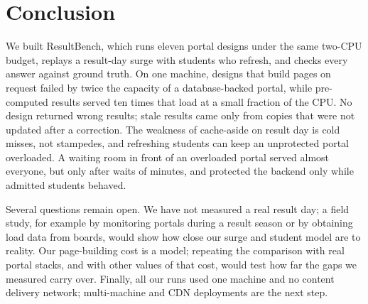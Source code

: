 \section{Conclusion}
\label{sec:conclusion}

We built ResultBench, which runs eleven portal designs
under the same two-CPU budget, replays a result-day surge with students who
refresh, and checks every answer against ground truth. On one machine, designs
that build pages on request failed by twice the capacity of a database-backed
portal, while pre-computed results served ten times that load at a small
fraction of the CPU. No design returned wrong results; stale results came only
from copies that were not updated after a correction. The weakness of
cache-aside on result day is cold misses, not stampedes, and refreshing
students can keep an unprotected portal overloaded.
A waiting room in front of an overloaded portal served almost everyone, but
only after waits of minutes, and protected the backend only while admitted
students behaved.

Several questions remain open. We have not measured a real result day; a field
study, for example by monitoring portals during a result season or by
obtaining load data from boards, would show how close our surge and student
model are to reality. Our page-building cost is a model; repeating the
comparison with real portal stacks, and with other values of that cost, would
test how far the gaps we measured carry over. Finally, all our runs used one
machine and no content delivery network; multi-machine and CDN deployments are
the next step.

